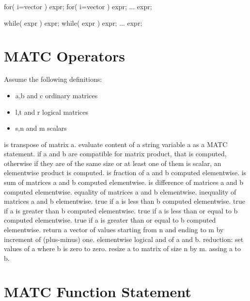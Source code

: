 for( i=vector ) expr;
for( i=vector )
{
    expr;
    ...
    expr;
}

while( expr ) expr;
while( expr )
{
    expr;
    ...
    expr;
}
\ttend



\section{MATC Operators}

Assume the following definitions:
\begin{itemize}
\item a,b and c ordinary matrices  
\item l,t and r logical matrices 
\item s,n and m scalars 
\end{itemize}

\sifbegin
{} is transpose of matrix a. 
 evaluate content of a string variable a as a MATC statement. 
 if a and b are compatible for matrix product, that is computed, 
otherwise if they are of the same size or at least one of them is scalar, an elementwise product is computed. 
 is fraction of a and b computed elementwise. 
 is sum of matrices a and b computed elementwise. 
 is difference of matrices a and b computed elementwise. 
 equality of matrices a and b elementwise.  
 inequality of matrices a and b elementwise.  
 true if a is less than b computed elementwise. 
 true if a is greater than b computed elementwise.
 true if a is less than or equal to b computed elementwise. 
 true if a is greater than or equal to b computed elementwise. 
 return a vector of values starting from n and ending to m by increment of (plus-minus) one.  
elementwise logical and of a and b. 
 reduction: set values of a where b is zero to zero. 
 resize a to matrix of size n by m. 
 assing a to b. 
\sifend


\section{MATC Function Statement}


